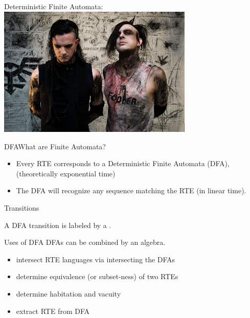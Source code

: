 


\begin{frame}{Deterministic Finite Automata: }
  \centering
  \includegraphics[width=0.7\textwidth]{fa-band.jpg}
\end{frame}


\begin{frame}{DFA}{What are Finite Automata?}
  \begin{itemize}
  \item   Every RTE corresponds to a Deterministic Finite Automata (DFA),  (theoretically exponential time)

  \item   The DFA will recognize any sequence matching the RTE (in linear time).

  \end{itemize}
\end{frame}

\begin{frame}{ Transitions}

  \scalebox{0.8}{}

  A DFA transition is labeled by a .
\end{frame}



\begin{frame}{Uses of DFA}
  DFAs can be combined by an algebra.

  \begin{itemize}
  \item intersect RTE languages via intersecting the DFAs
  \item determine equivalence (or subset-ness) of two RTEs
  \item determine habitation and vacuity
  \item extract RTE from DFA
  \end{itemize}
\end{frame}



